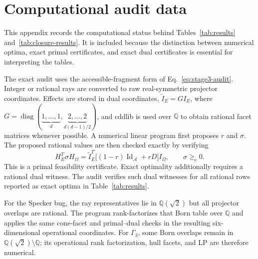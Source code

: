 \documentclass[aps,pra,twocolumn,superscriptaddress,nofootinbib]{revtex4-2}
\begin{document}
\section{Computational audit data}
\label{app:audit}

This appendix records the computational status behind Tables~\ref{tab:results} and~\ref{tab:closure-results}.  It is included because the distinction between numerical optima, exact primal certificates, and exact dual certificates is essential for interpreting the tables.

The exact audit uses the accessible-fragment form of Eq.~\eqref{eq:stage3-audit}.  Integer or rational rays are converted to raw real-symmetric projector coordinates.  Effects are stored in dual coordinates, \(\widetilde I_E=GI_E\), where $G=\operatorname{diag}(\underbrace{1,\ldots,1}_{d},\underbrace{2,\ldots,2}_{d(d-1)/2})$, and cddlib is used over $\mathbb Q$ to obtain rational facet matrices whenever possible.  A numerical linear program first proposes $r$ and $\sigma$.  The proposed rational values are then checked exactly by verifying
\begin{equation}
        H_E^T\sigma H_\Omega
        =\widetilde I_E^T\bigl[(1-r)\operatorname{Id}_{\mathcal A}+rD\bigr]I_\Omega,
        \qquad \sigma\ge_{\mathrm e}0.
        \label{eq:exact-primal-check}
\end{equation}
This is a primal feasibility certificate.  Exact optimality additionally requires a rational dual witness.  The audit verifies such dual witnesses for all rational rows reported as exact optima in Table~\ref{tab:results}.

For the Specker bug, the ray representatives lie in $\mathbb Q(\sqrt2)$ but
all projector overlaps are rational.  The program rank-factorizes that Born
table over $\mathbb Q$ and applies the same cone-facet and primal--dual checks
in the resulting six-dimensional operational coordinates.  For $\Gamma_3$,
some Born overlaps remain in $\mathbb Q(\sqrt2)\setminus\mathbb Q$; its
operational rank factorization, hull facets, and LP are therefore numerical.
\end{document}

